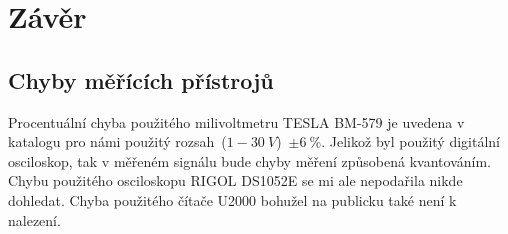 \section*{Závěr}
  
  
  \subsection*{Chyby měřících přístrojů}
    \indent\indent
    Procentuální chyba použitého milivoltmetru TESLA BM-579 je uvedena v katalogu pro námi použitý rozsah~($1-30~V$)~$\pm6~\%$. Jelikož byl použitý digitální osciloskop, tak v měřeném signálu bude chyby měření způsobená kvantováním. Chybu použitého osciloskopu RIGOL DS1052E se mi ale nepodařila nikde dohledat. Chyba použitého čítače U2000 bohužel na publicku také není k nalezení.
  
